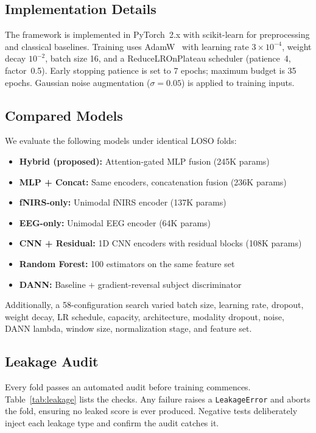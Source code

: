 \documentclass[conference]{IEEEtran}
\begin{document}
\subsection{Implementation Details}

The framework is implemented in PyTorch~2.x with scikit-learn for preprocessing and classical baselines. Training uses AdamW~\cite{loshchilov2019decoupled} with learning rate $3 \times 10^{-4}$, weight decay $10^{-2}$, batch size 16, and a ReduceLROnPlateau scheduler (patience~4, factor~0.5). Early stopping patience is set to 7 epochs; maximum budget is 35 epochs. Gaussian noise augmentation ($\sigma = 0.05$) is applied to training inputs.

\subsection{Compared Models}

We evaluate the following models under identical LOSO folds:
\begin{itemize}
    \item \textbf{Hybrid (proposed):} Attention-gated MLP fusion (245K params)
    \item \textbf{MLP + Concat:} Same encoders, concatenation fusion (236K params)
    \item \textbf{fNIRS-only:} Unimodal fNIRS encoder (137K params)
    \item \textbf{EEG-only:} Unimodal EEG encoder (64K params)
    \item \textbf{CNN + Residual:} 1D CNN encoders with residual blocks (108K params)
    \item \textbf{Random Forest:} 100 estimators on the same feature set
    \item \textbf{DANN:} Baseline + gradient-reversal subject discriminator~\cite{ganin2016domain}
\end{itemize}

Additionally, a 58-configuration search varied batch size, learning rate, dropout, weight decay, LR schedule, capacity, architecture, modality dropout, noise, DANN lambda, window size, normalization stage, and feature set.

\subsection{Leakage Audit}

Every fold passes an automated audit before training commences. Table~\ref{tab:leakage} lists the checks. Any failure raises a \texttt{LeakageError} and aborts the fold, ensuring no leaked score is ever produced. Negative tests deliberately inject each leakage type and confirm the audit catches it.
\end{document}
